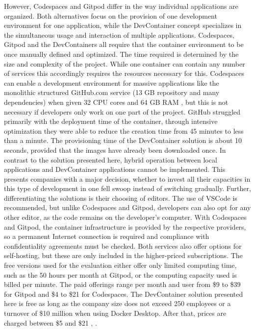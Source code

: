         However, Codespaces and Gitpod differ in the way individual applications are organized. Both alternatives focus on the provision of one development environment for one application, while the DevContainer concept specializes in the simultaneous usage and interaction of multiple applications. Codespaces, Gitpod and the DevContainers all require that the container environment to be once manually defined and optimized. The time required is determined by the size and complexity of the project. While one container can contain any number of services this accordingly requires the resources necessary for this. Codespaces can enable a development environment for massive applications like the monolithic structured GitHub.com service (13 GB repository and many dependencies) when given 32 CPU cores and 64 GB RAM \cite{githubblogcodespace}, but this is not necessary if developers only work on one part of the project. GitHub struggled primarily with the deployment time of the container, through intensive optimization they were able to reduce the creation time from 45 minutes to less than a minute. The provisioning time of the DevContainer solution is about 10 seconds, provided that the images have already been downloaded once. In contrast to the solution presented here, hybrid operation between local applications and DevContainer applications cannot be implemented. This presents companies with a major decision, whether to invest all their capacities in this type of development in one fell swoop instead of switching gradually. \newline
        Further, differentiating the solutions is their choosing of editors. The use of VSCode is recommended, but unlike Codespaces and Gitpod, developers can also opt for any other editor, as the code remains on the developer's computer. With Codespaces and Gitpod, the container infrastructure is provided by the respective providers, so a permanent Internet connection is required and compliance with confidentiality agreements must be checked. Both services also offer options for self-hosting, but these are only included in the higher-priced subscriptions. The free versions used for the evaluation either offer only limited computing time, such as the 50 hours per month at Gitpod, or the computing capacity used is billed per minute. The paid offerings range per month and user from \$9 to \$39 for Gitpod and \$4 to \$21 for Codespaces. The DevContainer solution presented here is free as long as the company size does not exceed 250 employees or a turnover of \$10 million when using Docker Desktop. After that, prices are charged between \$5 and \$21 \cite{gitpod}, \cite{githubblogcodespace}.\newline
